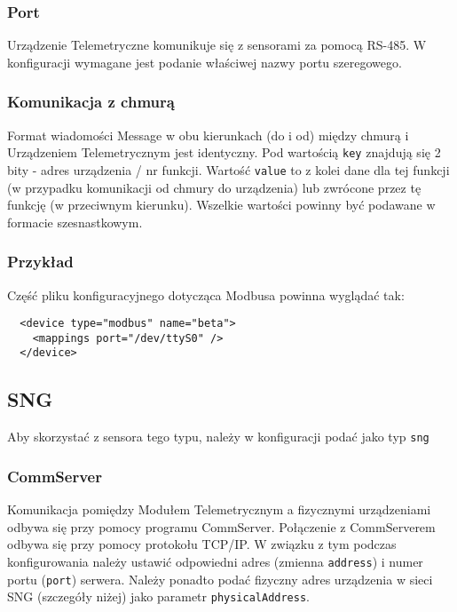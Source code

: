 \documentclass[11pt]{article}
\begin{document}
\subsubsection{Port}
Urządzenie Telemetryczne komunikuje się z sensorami za pomocą RS-485. W konfiguracji wymagane
jest podanie właściwej nazwy portu szeregowego.

\subsubsection{Komunikacja z chmurą}
Format wiadomości Message w obu kierunkach (do i od) między chmurą i Urządzeniem Telemetrycznym jest identyczny.
Pod wartością \verb|key| znajdują się 2 bity - adres urządzenia / nr funkcji. Wartość \verb|value| to z kolei dane
dla tej funkcji (w przypadku komunikacji od chmury do urządzenia) lub zwrócone przez tę funkcję (w przeciwnym kierunku).
Wszelkie wartości powinny być podawane w formacie szesnastkowym.

\subsubsection{Przykład}
Część pliku konfiguracyjnego dotycząca Modbusa powinna wyglądać tak:
\begin{verbatim}
  <device type="modbus" name="beta">
    <mappings port="/dev/ttyS0" />
  </device>
\end{verbatim}


\subsection{SNG}
Aby skorzystać z sensora tego typu, należy w konfiguracji podać jako typ \verb|sng|
\subsubsection{CommServer}
Komunikacja pomiędzy Modułem Telemetrycznym a fizycznymi urządzeniami odbywa się przy pomocy
programu CommServer. Połączenie z CommServerem odbywa się przy pomocy protokołu TCP/IP.
W związku z tym podczas konfigurowania należy ustawić odpowiedni adres (zmienna \verb|address|)
i numer portu (\verb|port|) serwera. Należy ponadto podać fizyczny adres urządzenia w sieci 
SNG (szczegóły niżej) jako parametr \verb|physicalAddress|.
\end{document}
